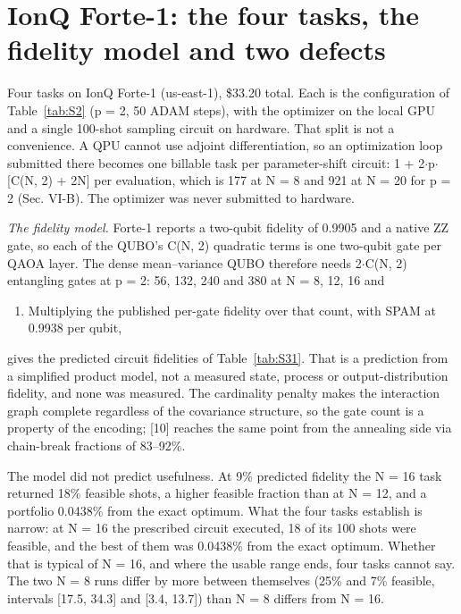 \documentclass[journal]{IEEEtran}
\begin{document}
\section{IonQ Forte-1: the four tasks, the fidelity model and two defects}


Four tasks on IonQ Forte-1 (us-east-1), \$33.20 total. Each is the configuration of Table~\ref{tab:S2} (p = 2, 50 ADAM steps), with the optimizer on the local GPU and a single 100-shot sampling circuit on hardware. That split is not a convenience. A QPU cannot use adjoint differentiation, so an optimization loop submitted there becomes one billable task per parameter-shift circuit: 1 + 2$\cdot$p$\cdot$[C(N, 2) + 2N] per evaluation, which is 177 at N = 8 and 921 at N = 20 for p = 2 (Sec. VI-B). The optimizer was never submitted to hardware.


\textit{The fidelity model.} Forte-1 reports a two-qubit fidelity of 0.9905 and a native ZZ gate, so each of the QUBO's C(N, 2) quadratic terms is one two-qubit gate per QAOA layer. The dense mean--variance QUBO therefore needs 2$\cdot$C(N, 2) entangling gates at p = 2: 56, 132, 240 and 380 at N = 8, 12, 16 and

\begin{enumerate}
\item Multiplying the published per-gate fidelity over that count, with SPAM at 0.9938 per qubit,
\end{enumerate}

gives the predicted circuit fidelities of Table~\ref{tab:S31}. That is a prediction from a simplified product model, not a measured state, process or output-distribution fidelity, and none was measured. The cardinality penalty makes the interaction graph complete regardless of the covariance structure, so the gate count is a property of the encoding; [10] reaches the same point from the annealing side via chain-break fractions of 83--92\%.


The model did not predict usefulness. At 9\% predicted fidelity the N = 16 task returned 18\% feasible shots, a higher feasible fraction than at N = 12, and a portfolio 0.0438\% from the exact optimum. What the four tasks establish is narrow: at N = 16 the prescribed circuit executed, 18 of its 100 shots were feasible, and the best of them was 0.0438\% from the exact optimum. Whether that is typical of N = 16, and where the usable range ends, four tasks cannot say. The two N = 8 runs differ by more between themselves (25\% and 7\% feasible, intervals [17.5, 34.3] and [3.4, 13.7]) than N = 8 differs from N = 16.
\end{document}
